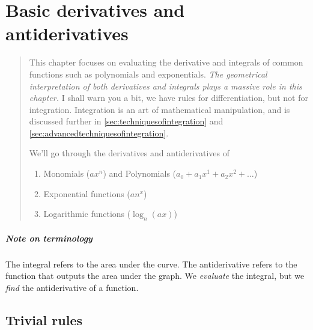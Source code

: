 \chapter{Basic derivatives and antiderivatives}
\label{sec:basicderivativesandintegrals}

\begin{abstract}
    This chapter focuses on evaluating the derivative and integrals of common functions such as polynomials and exponentials. \emph{The geometrical interpretation of both derivatives and integrals plays a massive role in this chapter.} I shall warn you a bit, we have rules for differentiation, but not for integration. Integration is an art of mathematical manipulation, and is discussed further in \cref{sec:techniquesofintegration} and \cref{sec:advancedtechniquesofintegration}.

    We'll go through the derivatives and antiderivatives of
    \begin{enumerate}[noitemsep]
        \item Monomials ($ax^n$) and Polynomials ($a_0 + a_1x^1 + a_2x^2 +\dots$)
        \item Exponential functions ($an^x$)
        \item Logarithmic functions ($\log_{n}(ax)$)
    \end{enumerate}

\end{abstract}

\paragraph{Note on terminology} The integral refers to the area under the curve. The antiderivative refers to the function that outputs the area under the graph. We \emph{evaluate} the integral, but we \emph{find} the antiderivative of a function.

\section{Trivial rules}

